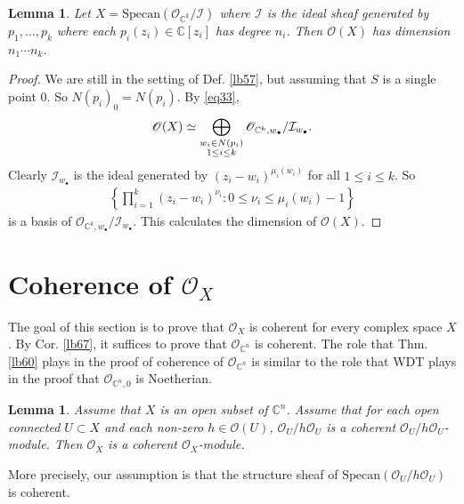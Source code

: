 \documentclass[12pt,b5paper,notitlepage]{report}
\theoremstyle{definition}
\theoremstyle{plain}
\newtheorem{lm}[df]{Lemma}
\newcommand{\mc}{\mathcal}
\newcommand{\scr}{\mathscr}
\newcommand{\blt}{\bullet}
\newcommand{\Cbb}{\mathbb C}
\newcommand{\Specan}{\mathrm{Specan}}
\numberwithin{equation}{section}
\begin{document}
\begin{lm}
Let $X=\Specan(\scr O_{\Cbb^k}/\mc I)$ where $\mc I$ is the ideal sheaf generated by $p_1,\dots,p_k$ where each $p_i(z_i)\in\Cbb[z_i]$ has degree $n_i$. Then $\scr O(X)$ has dimension $n_1\cdots n_k$.
\end{lm}

\begin{proof}
We are still in the setting of Def. \ref{lb57}, but assuming that $S$ is a single point $0$. So $N(p_i)_0=N(p_i)$. By \eqref{eq33},
\begin{align*}
\scr O(X)\simeq\bigoplus_{\begin{subarray}{c}
w_i\in N(p_i)\\
1\leq i\leq k
\end{subarray}} \scr O_{\Cbb^k,w_\blt}/\mc I_{w_\blt}.
\end{align*}
Clearly $\mc I_{w_\blt}$ is the ideal generated by $(z_i-w_i)^{\mu_i(w_i)}$ for all $1\leq i\leq k$. So
\begin{align*}
\left\{\prod_{i=1}^k(z_i-w_i)^{\nu_i}:0\leq\nu_i\leq \mu_i(w_i)-1\right\}
\end{align*}
is a basis of $\scr O_{\Cbb^k,w_\blt}/\mc I_{w_\blt}$. This calculates the dimension of $\scr O(X)$.
\end{proof}




\section{Coherence of $\scr O_X$}

The goal of this section is to prove that $\scr O_X$ is coherent for every complex space $X$. By Cor. \ref{lb67}, it suffices to prove that $\scr O_{\Cbb^n}$ is coherent. The role that Thm. \ref{lb60} plays in the proof of coherence of $\scr O_{\Cbb^n}$ is similar to the role that WDT plays in the proof that $\scr O_{\Cbb^n,0}$ is Noetherian.






\begin{lm}\label{lb69}
Assume that $X$ is an open subset of $\Cbb^n$. Assume that for each open connected $U\subset X$ and each non-zero $h\in\scr O(U)$, $\scr O_U/h\scr O_U$ is a coherent $\scr O_U/h\scr O_U$-module. Then $\scr O_X$ is a coherent $\scr O_X$-module. 
\end{lm}

More precisely, our assumption is that the structure sheaf of $\Specan(\scr O_U/h\scr O_U)$ is coherent.
\end{document}
